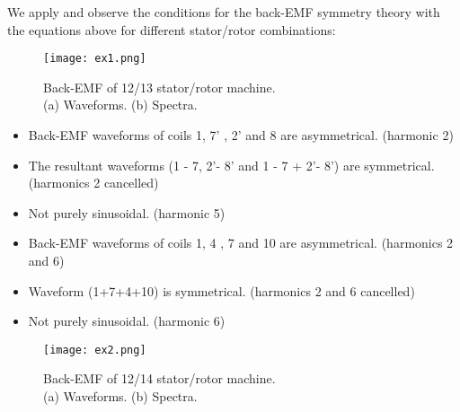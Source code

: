 We apply and observe the conditions for the back-EMF symmetry theory with  the equations above for different stator/rotor combinations:

\begin{minipage}[b]{0.46\linewidth}
    \begin{figure}[H]
        \texttt{[image: ex1.png]}
        \caption{Back-EMF of 12/13 stator/rotor machine. \\(a) Waveforms. (b) Spectra.}
    \end{figure}
\end{minipage}
\begin{minipage}[b]{0.46\linewidth}
\begin{itemize}
    \item Back-EMF waveforms of coils 1, 7’ , 2’ and 8 are asymmetrical. (harmonic 2)
    \item The resultant waveforms (1 - 7, 2’- 8’ and 1 - 7 + 2’- 8’) are symmetrical. (harmonics 2 cancelled)
    \item Not purely sinusoidal. (harmonic 5)
\end{itemize}
\end{minipage}

\begin{minipage}[b]{0.46\linewidth}
\begin{itemize}
    \item Back-EMF waveforms of coils 1, 4 , 7 and 10 are asymmetrical. (harmonics 2 and 6)
    \item Waveform (1+7+4+10) is symmetrical. (harmonics 2 and 6 cancelled)
    \item Not purely sinusoidal. (harmonic 6)
\end{itemize}
\end{minipage}
\begin{minipage}[b]{0.46\linewidth}
    \begin{figure}[H]
    \texttt{[image: ex2.png]}
    \caption{Back-EMF of 12/14 stator/rotor machine.\\ (a) Waveforms. (b) Spectra.}
    \end{figure}
\end{minipage}


